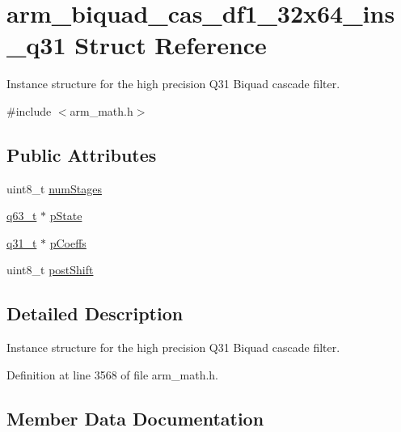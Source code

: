 \hypertarget{structarm__biquad__cas__df1__32x64__ins__q31}{}\section{arm\+\_\+biquad\+\_\+cas\+\_\+df1\+\_\+32x64\+\_\+ins\+\_\+q31 Struct Reference}
\label{structarm__biquad__cas__df1__32x64__ins__q31}


Instance structure for the high precision Q31 Biquad cascade filter.  




{\ttfamily \#include $<$arm\+\_\+math.\+h$>$}

\subsection*{Public Attributes}
\begin{DoxyCompactItemize}
\item 
uint8\+\_\+t \hyperlink{structarm__biquad__cas__df1__32x64__ins__q31_ad7cb9a9f5df8f4fcfc7a0b633672e574}{num\+Stages}
\item 
\hyperlink{arm__math_8h_a5aea1cb12fc02d9d44c8abf217eaa5c6}{q63\+\_\+t} $\ast$ \hyperlink{structarm__biquad__cas__df1__32x64__ins__q31_a4c899cdfaf2bb955323e93637bd662e0}{p\+State}
\item 
\hyperlink{arm__math_8h_adc89a3547f5324b7b3b95adec3806bc0}{q31\+\_\+t} $\ast$ \hyperlink{structarm__biquad__cas__df1__32x64__ins__q31_a490462d6ebe0fecfb6acbf51bed22ecf}{p\+Coeffs}
\item 
uint8\+\_\+t \hyperlink{structarm__biquad__cas__df1__32x64__ins__q31_a8e9d58e8dba5aa3b2fc4f36d2ed07996}{post\+Shift}
\end{DoxyCompactItemize}


\subsection{Detailed Description}
Instance structure for the high precision Q31 Biquad cascade filter. 

Definition at line 3568 of file arm\+\_\+math.\+h.



\subsection{Member Data Documentation}
\mbox{\label{structarm__biquad__cas__df1__32x64__ins__q31_ad7cb9a9f5df8f4fcfc7a0b633672e574}} 

